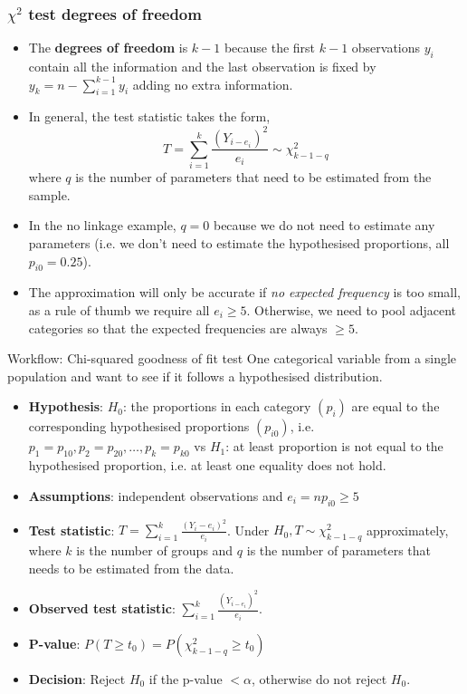 \documentclass[a4paper]{article}
\begin{document}
\subsubsection{\( \chi^2 \) test degrees of freedom}
\begin{itemize}
	\item The \textbf{degrees of freedom} is \( k-1 \) because the first \( k-1 \) observations \( y_i \) contain all the information and the last observation is fixed by \( y_k = n - \sum\limits_{i=1}^{k-1} y_i \) adding no extra information.
	\item In general, the test statistic takes the form,
	\[
		T = \sum_{i=1}^{k} \frac{(Y_{i-e_i})^2}{e_i} \sim \chi^2_{k-1-q}
	\]
	where \( q \) is the number of parameters that need to be estimated from the sample.
	\item In the no linkage example, \( q = 0 \) because we do not need to estimate any parameters (i.e. we don't need to estimate the hypothesised proportions, all \( p_{i0} = 0.25 \)).
	\item  The approximation will only be accurate if \textit{no expected frequency} is too small, as a rule of thumb we require all \( e_i \geq 5 \). Otherwise, we need to pool adjacent categories so that the expected frequencies are always \( \geq 5 \).
\end{itemize}
\begin{redbox}{Workflow: Chi-squared goodness of fit test}
	One categorical variable from a single population and want to see if it follows a hypothesised distribution.
	\begin{itemize}
		\item \textbf{Hypothesis}: \( H_0 \): the proportions in each category \( (p_i) \) are equal to the corresponding hypothesised proportions \( (p_{i0}) \), i.e. \( p_1 = p_{10}, p_2 = p_{20}, \dotsc, p_k = p_{k0} \) vs \( H_1 \): at least proportion is not equal to the hypothesised proportion, i.e. at least one equality does not hold.
		\item \textbf{Assumptions}: independent observations and \( e_i = np_{i0} \geq 5 \)
		\item \textbf{Test statistic}: \( T = \sum\limits_{i=1}^{k} \frac{(Y_i -e_i)^2}{e_i} \). Under \( H_0, T \sim \chi^2_{k-1-q} \) approximately, where \( k \) is the number of groups and \( q \) is the number of parameters that needs to be estimated from the data.
		\item \textbf{Observed test statistic}: \( \sum\limits_{i=1}^{k} \frac{(Y_{i-e_i})^2}{e_i} \).
		\item \textbf{P-value}: \( P(T\geq t_0) = P(\chi^2_{k-1-q} \geq t_0) \)
		\item \textbf{Decision}: Reject \( H_0 \) if the p-value \( < \alpha \), otherwise do not reject \( H_0 \).
	\end{itemize}
\end{redbox}
\end{document}
